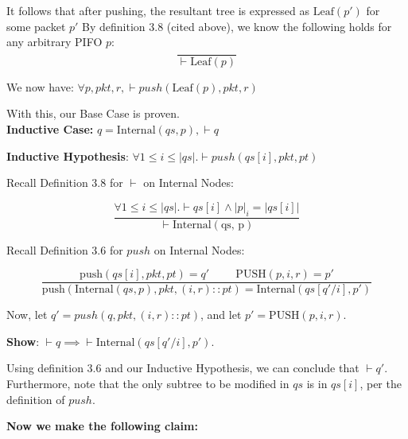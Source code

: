 \documentclass{article}
\begin{document}
\noindent It follows that after pushing, the resultant tree is expressed as $\text{Leaf}(p')$ for some packet $p'$ By definition 3.8 (cited above), we know the following holds for any arbitrary PIFO $p$:\\[-10pt]

$$\frac{}{\vdash \text{Leaf}(p)}$$

\noindent We now have: $\forall p, pkt, r, \vdash push(\text{Leaf}(p), pkt, r)$\newline

\noindent With this, our Base Case is proven.\\[10pt]

\noindent \textbf{Inductive Case:} $q = \text{Internal}(qs, p), \vdash q$\newline

\noindent \textbf{Inductive Hypothesis}: $\forall 1 \leq i \leq |qs|. \vdash push(qs[i], pkt, pt)$\newline

\noindent Recall Definition 3.8 for $\vdash$ on Internal Nodes:

$$\frac{\forall 1 \leq i \leq |qs|. \vdash qs[i] \land |p|_i = |qs[i]|}{\vdash \text{Internal}(\text{qs, p})}$$\newline

\noindent Recall Definition 3.6 for $push$ on Internal Nodes:

$$\frac{\text{push}(qs[i], pkt, pt) = q' \hspace{1cm} \text{PUSH}(p, i, r) = p'}{\text{push}(\text{Internal}(qs, p), pkt, (i, r) :: pt) = \text{Internal}(qs[q'/i], p')}$$\newline

\noindent Now, let $q' = push(q, pkt, (i, r) :: pt)$, and let $p' = \text{PUSH}(p, i, r)$.\newline

\noindent \textbf{Show}: $\vdash q \implies \vdash \text{Internal}(qs[q'/i], p')$.\newline

\noindent Using definition 3.6 and our Inductive Hypothesis, we can conclude that $\vdash q'$. Furthermore, note that the only subtree to be modified in $qs$ is in $qs[i]$, per the definition of $push$.\newline

\noindent \textbf{Now we make the following claim:}
\end{document}
